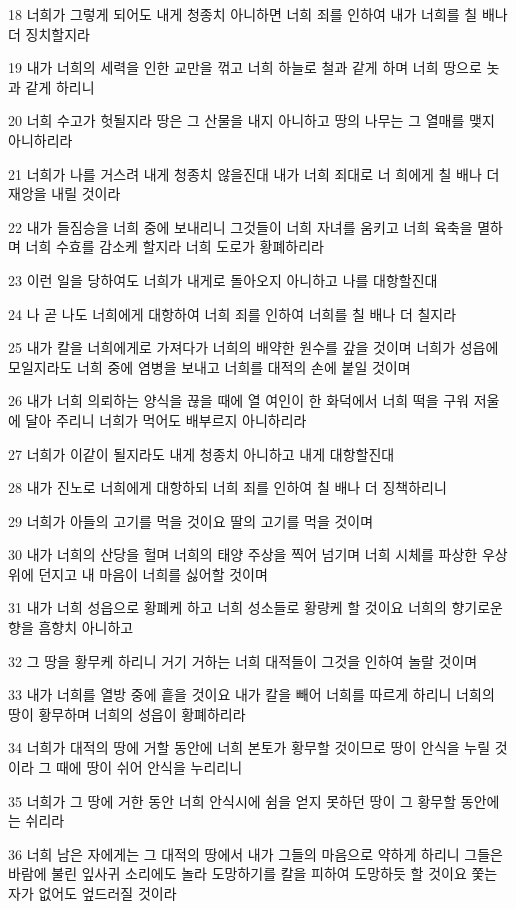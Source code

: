 \par 18 너희가 그렇게 되어도 내게 청종치 아니하면 너희 죄를 인하여 내가 너희를 칠 배나 더 징치할지라
\par 19 내가 너희의 세력을 인한 교만을 꺾고 너희 하늘로 철과 같게 하며 너희 땅으로 놋과 같게 하리니
\par 20 너희 수고가 헛될지라 땅은 그 산물을 내지 아니하고 땅의 나무는 그 열매를 맺지 아니하리라
\par 21 너희가 나를 거스려 내게 청종치 않을진대 내가 너희 죄대로 너 희에게 칠 배나 더 재앙을 내릴 것이라
\par 22 내가 들짐승을 너희 중에 보내리니 그것들이 너희 자녀를 움키고 너희 육축을 멸하며 너희 수효를 감소케 할지라 너희 도로가 황폐하리라
\par 23 이런 일을 당하여도 너희가 내게로 돌아오지 아니하고 나를 대항할진대
\par 24 나 곧 나도 너희에게 대항하여 너희 죄를 인하여 너희를 칠 배나 더 칠지라
\par 25 내가 칼을 너희에게로 가져다가 너희의 배약한 원수를 갚을 것이며 너희가 성읍에 모일지라도 너희 중에 염병을 보내고 너희를 대적의 손에 붙일 것이며
\par 26 내가 너희 의뢰하는 양식을 끊을 때에 열 여인이 한 화덕에서 너희 떡을 구워 저울에 달아 주리니 너희가 먹어도 배부르지 아니하리라
\par 27 너희가 이같이 될지라도 내게 청종치 아니하고 내게 대항할진대
\par 28 내가 진노로 너희에게 대항하되 너희 죄를 인하여 칠 배나 더 징책하리니
\par 29 너희가 아들의 고기를 먹을 것이요 딸의 고기를 먹을 것이며
\par 30 내가 너희의 산당을 헐며 너희의 태양 주상을 찍어 넘기며 너희 시체를 파상한 우상 위에 던지고 내 마음이 너희를 싫어할 것이며
\par 31 내가 너희 성읍으로 황폐케 하고 너희 성소들로 황량케 할 것이요 너희의 향기로운 향을 흠향치 아니하고
\par 32 그 땅을 황무케 하리니 거기 거하는 너희 대적들이 그것을 인하여 놀랄 것이며
\par 33 내가 너희를 열방 중에 흩을 것이요 내가 칼을 빼어 너희를 따르게 하리니 너희의 땅이 황무하며 너희의 성읍이 황폐하리라
\par 34 너희가 대적의 땅에 거할 동안에 너희 본토가 황무할 것이므로 땅이 안식을 누릴 것이라 그 때에 땅이 쉬어 안식을 누리리니
\par 35 너희가 그 땅에 거한 동안 너희 안식시에 쉼을 얻지 못하던 땅이 그 황무할 동안에는 쉬리라
\par 36 너희 남은 자에게는 그 대적의 땅에서 내가 그들의 마음으로 약하게 하리니 그들은 바람에 불린 잎사귀 소리에도 놀라 도망하기를 칼을 피하여 도망하듯 할 것이요 쫓는 자가 없어도 엎드러질 것이라
